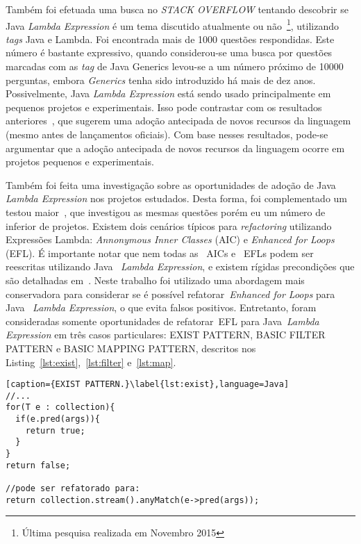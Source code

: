 Também foi efetuada uma busca no \textit{STACK OVERFLOW} tentando descobrir se Java\textit{ Lambda Expression} é um tema discutido atualmente ou não~\footnote{Última pesquisa realizada em Novembro 2015}, utilizando \textit{tags} Java e Lambda. Foi encontrada mais de \num{1000} questões respondidas. Este número é bastante expressivo, quando considerou-se uma busca por questões marcadas com as \textit{tag} de Java Generics levou-se a um número próximo de \num{10000} perguntas, embora \textit{Generics} tenha sido introduzido há mais de dez anos. Possivelmente, Java\textit{ Lambda Expression} está sendo usado principalmente em pequenos projetos e experimentais. Isso pode contrastar com os resultados anteriores~\cite{Dyer:ACM2014}, que sugerem uma adoção antecipada de novos recursos da linguagem (mesmo antes de lançamentos oficiais). Com base nesses resultados, pode-se argumentar que a adoção antecipada de novos recursos da linguagem ocorre em projetos pequenos e experimentais.

Também foi feita uma investigação sobre as oportunidades de adoção de Java~\textit{ Lambda Expression} nos projetos estudados. Desta forma, foi complementado um testou maior~\cite{gyori2013crossing}, que investigou as mesmas questões porém eu um número de  inferior de projetos. Existem dois cenários típicos para \textit{refactoring} utilizando Expressões Lambda: \textit{Annonymous Inner Classes} (\acs{AIC}) e \textit{Enhanced for Loops} (\acs{EFL}). É importante notar que nem todas as ~\acs{AIC}s e ~\acs{EFL}s podem ser reescritas utilizando Java~\textit{ Lambda Expression}, e existem rígidas precondições que são detalhadas em~\cite{gyori2013crossing}. Neste trabalho foi utilizado uma abordagem mais conservadora para considerar se é possível refatorar~\textit{Enhanced for Loops} para Java~\textit{ Lambda Expression}, o que evita falsos positivos.  Entretanto, foram consideradas somente 
oportunidades de refatorar~\acs{EFL} para Java~\textit{Lambda Expression} em três 
casos particulares: \textsc{EXIST PATTERN}, \textsc{BASIC FILTER PATTERN} e 
\textsc{BASIC MAPPING PATTERN}, descritos nos 
Listing~\ref{lst:exist},~\ref{lst:filter} e~\ref{lst:map}.

\begin{lstlisting}[caption={EXIST PATTERN.}\label{lst:exist},language=Java]
//...
for(T e : collection){
  if(e.pred(args)){
    return true;
  }
}
return false;

//pode ser refatorado para:
return collection.stream().anyMatch(e->pred(args));
\end{lstlisting}

